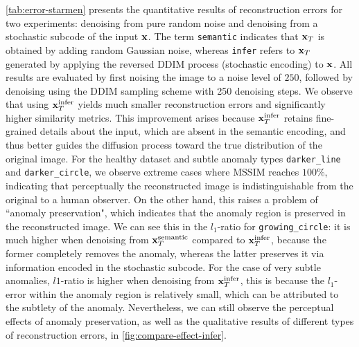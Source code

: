 \autoref{tab:error-starmen} presents the quantitative results of reconstruction errors for two experiments: denoising from pure random noise and denoising from a stochastic subcode of the input ${\mathbf{x}}$. The term \texttt{semantic} indicates that ${\mathbf{x}}_T$ is obtained by adding random Gaussian noise, whereas \texttt{infer} refers to ${\mathbf{x}}_T$ generated by applying the reversed DDIM process (stochastic encoding) to ${\mathbf{x}}$. All results are evaluated by first noising the image to a noise level of $250$, followed by denoising using the DDIM sampling scheme with 250 denoising steps. We observe that using ${\mathbf{x}}_T^{\text{infer}}$ yields much smaller reconstruction errors and significantly higher similarity metrics. This improvement arises because ${\mathbf{x}}_T^{\text{infer}}$ retains fine-grained details about the input, which are absent in the semantic encoding, and thus better guides the diffusion process toward the true distribution of the original image. For the healthy dataset and subtle anomaly types \texttt{darker\_line} and \texttt{darker\_circle}, we observe extreme cases where MSSIM reaches $100\%$, indicating that perceptually the reconstructed image is indistinguishable from the original to a human observer. On the other hand, this raises a problem of “anomaly preservation", which indicates that the anomaly region is preserved in the reconstructed image. We can see this in the $l_1$-ratio for \texttt{growing\_circle}: it is much higher when denoising from ${\mathbf{x}}_T^{\text{semantic}}$ compared to ${\mathbf{x}}_T^{\text{infer}}$, because the former completely removes the anomaly, whereas the latter preserves it via information encoded in the stochastic subcode. For the case of very subtle anomalies, $l1$-ratio is higher when denoising from ${\mathbf{x}}_T^{\text{infer}}$, this is because the $l_1$-error within the anomaly region is relatively small, which can be attributed to the subtlety of the anomaly. Nevertheless, we can still observe the perceptual effects of anomaly preservation, as well as the qualitative results of different types of reconstruction errors, in \cref{fig:compare-effect-infer}. 

